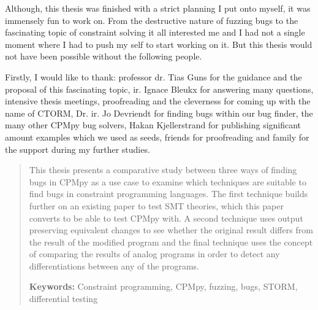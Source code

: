 \documentclass[master=cws,masteroption=se,english]{kulemt} %
\begin{document}
\begin{preface}
Although, this thesis was finished with a strict planning I put onto myself, it was immensely fun to work on. From the destructive nature of fuzzing bugs to the fascinating topic of constraint solving it all interested me and I had not a single moment where I had to push my self to start working on it. But this thesis would not have been possible without the following people.


\noindent Firstly, I would like to thank: 
professor dr. Tias Guns for the guidance and the proposal of this fascinating topic,
ir. Ignace Bleukx for answering many questions, intensive thesis meetings, proofreading and the cleverness for coming up with the name of CTORM, 
Dr. ir. Jo Devriendt for finding bugs within our bug finder, 
the many other CPMpy bug solvers, 
Hakan Kjellerstrand for publishing significant amount examples which we used as seeds,
friends for proofreading and 
family for the support during my further studies.
\end{preface}

\listoftodos
{}
\tableofcontents*
\setcounter{tocdepth}{5} %

\begin{abstract}
This thesis presents a comparative study between three ways of finding bugs in CPMpy as a use case to examine which techniques are suitable to find bugs in constraint programming languages. 
The first technique builds further on an existing paper to test SMT theories, which this paper converts to be able to test CPMpy with. 
A second technique uses output preserving equivalent changes to see whether the original result differs from the result of the modified program and 
the final technique uses the concept of comparing the results of analog programs in order to detect any differentiations between any of the programs. 

\vspace*{\fill}
\noindent
\textbf{Keywords:} Constraint programming, CPMpy, fuzzing, bugs, STORM, differential testing
\end{abstract}
\end{document}
